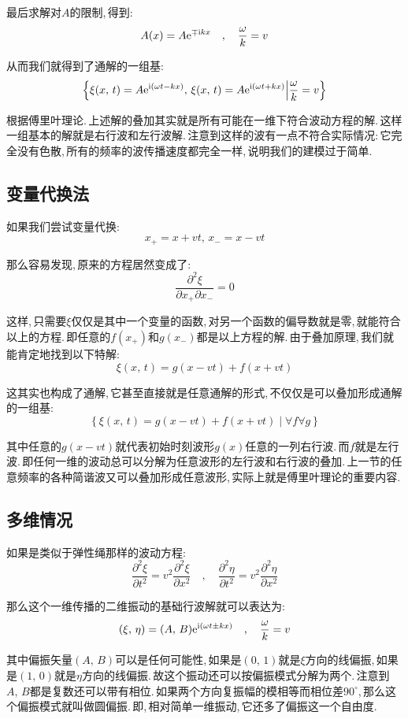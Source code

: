 最后求解对$A$的限制,\,得到:
\[A(x)=A{\rm e}^{\mp{\rm i} kx}\quad,\quad \frac{\omega}{k}=v\]

从而我们就得到了通解的一组基:
\[\left\{\xi(x,\,t)=A{\rm e}^{{\rm i}(\omega t-kx)},\,\xi(x,\,t)=A{\rm e}^{{\rm i}(\omega t+kx)}\middle|\frac{\omega}{k}=v \right\}\]

根据傅里叶理论.\,上述解的叠加其实就是所有可能在一维下符合波动方程的解.\,这样一组基本的解就是右行波和左行波解.\,注意到这样的波有一点不符合实际情况:\,它完全没有色散,\,所有的频率的波传播速度都完全一样,\,说明我们的建模过于简单.

\subsection{变量代换法}

如果我们尝试变量代换:
\[x_+=x+vt,\,x_-=x-vt\]

那么容易发现,\,原来的方程居然变成了:
\[\frac{\partial^2 \xi}{\partial x_+\partial x_-}=0\]

这样,\,只需要$\xi$仅仅是其中一个变量的函数,\,对另一个函数的偏导数就是零,\,就能符合以上的方程.\,即任意的$f(x_+)$和$g(x_-)$都是以上方程的解.\,由于叠加原理,\,我们就能肯定地找到以下特解:
\[\xi(x,\,t)=g(x-vt)+f(x+vt)\]

这其实也构成了通解,\,它甚至直接就是任意通解的形式,\,不仅仅是可以叠加形成通解的一组基:
\[\left\{\xi(x,\,t)=g(x-vt)+f(x+vt)\middle|\forall f\forall g\right\}\]

其中任意的$g(x-vt)$就代表初始时刻波形$g(x)$任意的一列右行波.\,而$f$就是左行波.\,即任何一维的波动总可以分解为任意波形的左行波和右行波的叠加.\,上一节的任意频率的各种简谐波又可以叠加形成任意波形,\,实际上就是傅里叶理论的重要内容.

\subsection{多维情况}

如果是类似于弹性绳那样的波动方程:
\[\frac{\partial^2 \xi}{\partial t^2}=
v^2 \frac{\partial^2 \xi}{\partial x^2}\quad,\quad \frac{\partial^2 \eta}{\partial t^2}=v^2 \frac{\partial^2 \eta}{\partial x^2}\]

那么这个一维传播的二维振动的基础行波解就可以表达为:
\[(\xi,\,\eta)=(A,\,B){\rm e}^{{\rm i}(\omega t\pm kx)}\quad,\quad \frac{\omega}{k}=v\]

其中偏振矢量$(A,\,B)$可以是任何可能性,\,如果是$(0,\,1)$就是$\xi$方向的线偏振,\,如果是$(1,\,0)$就是$\eta$方向的线偏振.\,故这个振动还可以按偏振模式分解为两个.\,注意到$A,\,B$都是复数还可以带有相位.\,如果两个方向复振幅的模相等而相位差$90^\circ$,\,那么这个偏振模式就叫做圆偏振.\,即,\,相对简单一维振动,\,它还多了偏振这一个自由度.


